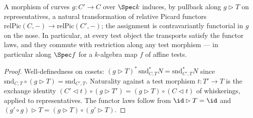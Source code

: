 \begin{lemma}
  \label{lem:relPicMapCurve}
  \leanok
  A morphism of curves \(g \colon C' \to C\) over \(\Spec k\) induces, by pullback along
  \(g \rhd T\) on representatives, a natural transformation of relative Picard functors
  \(\mathrm{relPic}(C,-) \to \mathrm{relPic}(C',-)\); the assignment is contravariantly
  functorial in \(g\) on the nose. In particular, at every test object the transports
  satisfy the functor laws, and they commute with restriction along any test morphism ---
  in particular along \(\Spec f\) for a \(k\)-algebra map \(f\) of affine tests.
\end{lemma}
\begin{proof}
  \leanok
  Well-definedness on cosets: \((g \rhd T)^{*}\,\mathrm{snd}_{C,T}^{*} N =
  \mathrm{snd}_{C',T}^{*} N\) since \(\mathrm{snd}_{C,T} \circ (g \rhd T) =
  \mathrm{snd}_{C',T}\). Naturality against a test morphism \(t \colon T' \to T\) is the
  exchange identity \((C' \lhd t) \circ (g \rhd T') = (g \rhd T) \circ (C \lhd t)\) of
  whiskerings, applied to representatives. The functor laws follow from
  \(\id \rhd T = \id\) and \((g' \circ g) \rhd T = (g \rhd T) \circ (g' \rhd T)\).
\end{proof}

